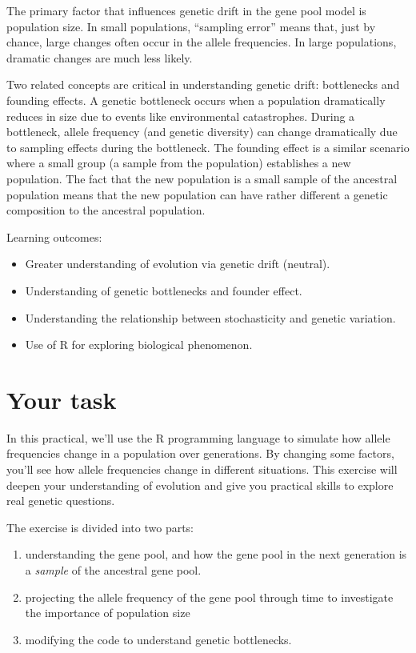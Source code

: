 \documentclass[
  a4paper]{book}
\providecommand{\tightlist}{%
  \setlength{\itemsep}{0pt}\setlength{\parskip}{0pt}}
\begin{document}
The primary factor that influences genetic drift in the gene pool model is population size. In small populations, ``sampling error'' means that, just by chance, large changes often occur in the allele frequencies. In large populations, dramatic changes are much less likely.

Two related concepts are critical in understanding genetic drift: bottlenecks and founding effects. A genetic bottleneck occurs when a population dramatically reduces in size due to events like environmental catastrophes. During a bottleneck, allele frequency (and genetic diversity) can change dramatically due to sampling effects during the bottleneck. The founding effect is a similar scenario where a small group (a sample from the population) establishes a new population. The fact that the new population is a small sample of the ancestral population means that the new population can have rather different a genetic composition to the ancestral population.

\begin{do-something}
Learning outcomes:

\begin{itemize}
\tightlist
\item
  Greater understanding of evolution via genetic drift (neutral).
\item
  Understanding of genetic bottlenecks and founder effect.
\item
  Understanding the relationship between stochasticity and genetic
  variation.
\item
  Use of R for exploring biological phenomenon.
\end{itemize}
\end{do-something}

\section{Your task}\label{your-task-12}

In this practical, we'll use the R programming language to simulate how allele frequencies change in a population over generations. By changing some factors, you'll see how allele frequencies change in different situations. This exercise will deepen your understanding of evolution and give you practical skills to explore real genetic questions.

The exercise is divided into two parts:

\begin{enumerate}
\def\labelenumi{(\arabic{enumi})}
\tightlist
\item
  understanding the gene pool, and how the gene pool in the next generation is a \emph{sample} of the ancestral gene pool.
\item
  projecting the allele frequency of the gene pool through time to investigate the importance of population size
\item
  modifying the code to understand genetic bottlenecks.
\end{enumerate}
\end{document}
